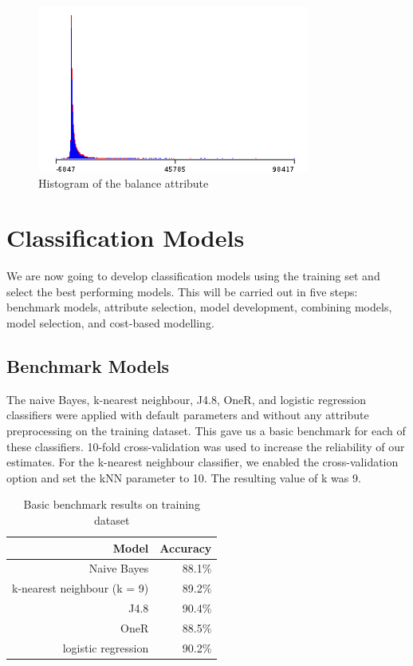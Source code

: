 \documentclass[a4paper,11pt]{article}
\begin{document}
\begin{figure}[H]
  \centering
  \includegraphics[width=0.8\textwidth]{pictures/balanceHistogram.png}
  \caption{Histogram of the balance attribute}
  \label{fig:balanceHistogram}
\end{figure}

\section{Classification Models}

We are now going to develop classification models using the training set and select the best performing models. This
will be carried out in five steps: benchmark models, attribute selection, model development, combining models, model selection,
and cost-based modelling.

\subsection{Benchmark Models}

The naive Bayes, k-nearest neighbour, J4.8, OneR, and logistic regression classifiers were applied with default parameters
and without any attribute preprocessing on the training dataset. This gave us a basic benchmark for each of these classifiers.
10-fold cross-validation was used to increase the reliability of our estimates. For the k-nearest neighbour classifier, 
we enabled the cross-validation option and set the kNN parameter to 10. The resulting value of k was 9.

\begin{table}[H]
  \begin{center}
    \begin{tabular}{r | r}
      Model & Accuracy  \\ \hline
      Naive Bayes & 88.1\% \\
      k-nearest neighbour (k = 9) & 89.2\% \\
      J4.8 & 90.4\% \\
      OneR & 88.5\% \\
      logistic regression & 90.2\% \\
    \end{tabular}
  \end{center}
  \caption{Basic benchmark results on training dataset}
  \label{tab:basicBenchmark}
\end{table}
\end{document}
